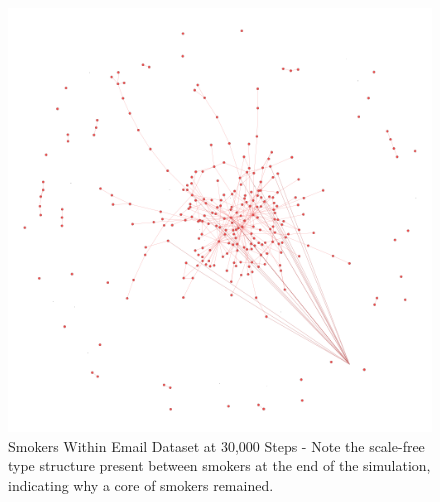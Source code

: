 \documentclass[]{report}
\begin{document}
\begin{figure}
\begin{center}
\includegraphics[scale=0.4]{email-smokers.png}
\end{center}
\caption{Smokers Within Email Dataset at 30,000 Steps - Note the scale-free type structure present between smokers at the end of the simulation, indicating why a core of smokers remained.}
\label{img:email-smok}
\end{figure}
\end{document}
